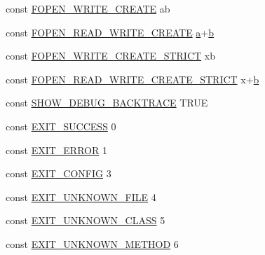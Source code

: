 \begin{DoxyCompactItemize}
\item 
const \hyperlink{_admin_2application_2config_2constants_8php_a7c5689a170bbaab4dd9c6f3a76bd7a0d}{F\+O\+P\+E\+N\+\_\+\+W\+R\+I\+T\+E\+\_\+\+C\+R\+E\+A\+T\+E} \textquotesingle{}ab\textquotesingle{}
\item 
const \hyperlink{_admin_2application_2config_2constants_8php_adcd04289bf4dc262b7652cb4c1eb08f7}{F\+O\+P\+E\+N\+\_\+\+R\+E\+A\+D\+\_\+\+W\+R\+I\+T\+E\+\_\+\+C\+R\+E\+A\+T\+E} \textquotesingle{}\hyperlink{_admin_2assets_2js_2bootstrap_8min_8js_a1f5870dcf487187f13d5fd328ed9e6e7}{a}+\hyperlink{_admin_2assets_2js_2bootstrap_8min_8js_a398bb8542498d1b14178b02b99df309b}{b}\textquotesingle{}
\item 
const \hyperlink{_admin_2application_2config_2constants_8php_a02007ca17f39af174ac54d30f2ca7e82}{F\+O\+P\+E\+N\+\_\+\+W\+R\+I\+T\+E\+\_\+\+C\+R\+E\+A\+T\+E\+\_\+\+S\+T\+R\+I\+C\+T} \textquotesingle{}xb\textquotesingle{}
\item 
const \hyperlink{_admin_2application_2config_2constants_8php_a2eeb98a015d74560e9b60ec60d7531d4}{F\+O\+P\+E\+N\+\_\+\+R\+E\+A\+D\+\_\+\+W\+R\+I\+T\+E\+\_\+\+C\+R\+E\+A\+T\+E\+\_\+\+S\+T\+R\+I\+C\+T} \textquotesingle{}x+\hyperlink{_admin_2assets_2js_2bootstrap_8min_8js_a398bb8542498d1b14178b02b99df309b}{b}\textquotesingle{}
\item 
const \hyperlink{_admin_2application_2config_2constants_8php_a7e2dd6fea73799257285946411aeb5ce}{S\+H\+O\+W\+\_\+\+D\+E\+B\+U\+G\+\_\+\+B\+A\+C\+K\+T\+R\+A\+C\+E} T\+R\+U\+E
\item 
const \hyperlink{_admin_2application_2config_2constants_8php_a44a73f871298e7befa219da1d96c4bf8}{E\+X\+I\+T\+\_\+\+S\+U\+C\+C\+E\+S\+S} 0
\item 
const \hyperlink{_admin_2application_2config_2constants_8php_a0072a08da382eee32afd352989a3cfc2}{E\+X\+I\+T\+\_\+\+E\+R\+R\+O\+R} 1
\item 
const \hyperlink{_admin_2application_2config_2constants_8php_a0c5a2fe588c43f68077982ecc971381e}{E\+X\+I\+T\+\_\+\+C\+O\+N\+F\+I\+G} 3
\item 
const \hyperlink{_admin_2application_2config_2constants_8php_a9d94a7e06ea3247295ecf2f17f077b77}{E\+X\+I\+T\+\_\+\+U\+N\+K\+N\+O\+W\+N\+\_\+\+F\+I\+L\+E} 4
\item 
const \hyperlink{_admin_2application_2config_2constants_8php_a7b2af799ecefe2b0471c319bafc26850}{E\+X\+I\+T\+\_\+\+U\+N\+K\+N\+O\+W\+N\+\_\+\+C\+L\+A\+S\+S} 5
\item 
const \hyperlink{_admin_2application_2config_2constants_8php_aeb461d43337d49e2ba92c555caa8597c}{E\+X\+I\+T\+\_\+\+U\+N\+K\+N\+O\+W\+N\+\_\+\+M\+E\+T\+H\+O\+D} 6

\end{DoxyCompactItemize}
